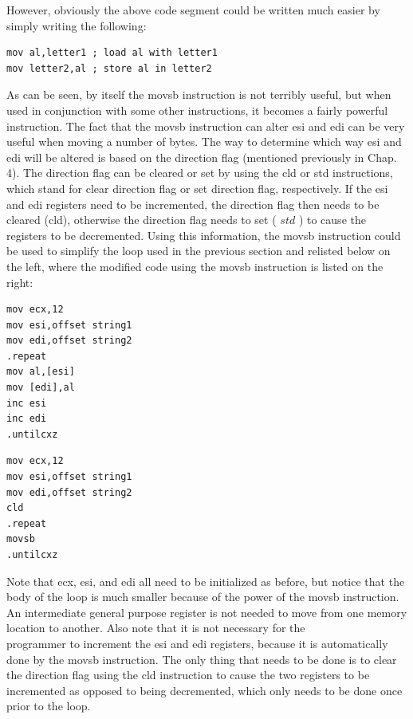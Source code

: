 \documentclass[10pt]{book}
\begin{document}
However, obviously the above code segment could be written much easier by simply writing the following:

\begin{verbatim}
mov al,letter1 ; load al with letter1
mov letter2,al ; store al in letter2
\end{verbatim}

As can be seen, by itself the movsb instruction is not terribly useful, but when used in conjunction with some other instructions, it becomes a fairly powerful instruction. The fact that the movsb instruction can alter esi and edi can be very useful when moving a number of bytes. The way to determine which way esi and edi will be altered is based on the direction flag (mentioned previously in Chap. 4). The direction flag can be cleared or set by using the cld or std instructions, which stand for clear direction flag or set direction flag, respectively. If the esi and edi registers need to be incremented, the direction flag then needs to be cleared (cld), otherwise the direction flag needs to set ( $s t d$ ) to cause the registers to be decremented. Using this information, the movsb instruction could be used to simplify the loop used in the previous section and relisted below on the left, where the modified code using the movsb instruction is listed on the right:

\begin{verbatim}
mov ecx,12
mov esi,offset string1
mov edi,offset string2
.repeat
mov al,[esi]
mov [edi],al
inc esi
inc edi
.untilcxz
\end{verbatim}

\begin{verbatim}
mov ecx,12
mov esi,offset string1
mov edi,offset string2
cld
.repeat
movsb
.untilcxz
\end{verbatim}

Note that ecx, esi, and edi all need to be initialized as before, but notice that the body of the loop is much smaller because of the power of the movsb instruction. An intermediate general purpose register is not needed to move from one memory location to another. Also note that it is not necessary for the\\
programmer to increment the esi and edi registers, because it is automatically done by the movsb instruction. The only thing that needs to be done is to clear the direction flag using the cld instruction to cause the two registers to be incremented as opposed to being decremented, which only needs to be done once prior to the loop.
\end{document}
